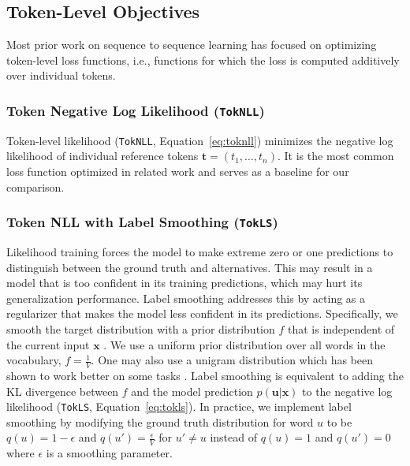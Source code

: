 \documentclass[11pt,a4paper]{article}
\newcommand{\source}{\mathbf{x}}
\newcommand{\goldreference}{\mathbf{t}}
\newcommand{\goldreferencetok}{t}
\newcommand{\candhypo}{\mathbf{u}}
\newcommand{\candhypotok}{u}
\newcommand{\TokNLL}{\texttt{TokNLL}}
\newcommand{\TokLS}{\texttt{TokLS}}
\begin{document}
\subsection{Token-Level Objectives}
\label{sec:tokobj}

Most prior work on sequence to sequence learning has focused on optimizing token-level loss functions, i.e., functions for which the loss is computed additively over individual tokens.

\subsubsection*{Token Negative Log Likelihood (\TokNLL)}
\label{sec:toknll}
Token-level likelihood (\TokNLL, Equation~\ref{eq:toknll}) minimizes the negative log likelihood of individual reference tokens $\goldreference = \left( \goldreferencetok_1, \dots, \goldreferencetok_n \right)$.
It is the most common loss function optimized in related work and serves as a baseline for our comparison.

\subsubsection*{Token NLL with Label Smoothing (\TokLS)}
\label{sec:tokls}
Likelihood training forces the model to make extreme zero or one predictions to distinguish between the ground truth and alternatives.
This may result in a model that is too confident in its training predictions, which may hurt its generalization performance.
Label smoothing addresses this by acting as a regularizer that makes the model less confident in its predictions.
Specifically, we smooth the target distribution with a prior distribution $f$ that is independent of the current input $\source$ \citep{szegedy2015inception,pereyra2017regularize,vaswani2017transformer}.
We use a uniform prior distribution over all words in the vocabulary, \( f = \frac{1}{V} \). One may also use a unigram distribution which has been shown to work better on some tasks \citep{pereyra2017regularize}.
Label smoothing is equivalent to adding the KL divergence between $f$ and the model prediction $p(\candhypo|\source)$ to the negative log likelihood (\TokLS, Equation~\ref{eq:tokls}).
In practice, we implement label smoothing by modifying the ground truth distribution for word $\candhypotok$ to be $q(\candhypotok) = 1 - \epsilon$ and $q(\candhypotok') = \frac{\epsilon}{V}$ for $\candhypotok' \ne \candhypotok$ instead of $q(\candhypotok) = 1$ and $q(\candhypotok') = 0$ where $\epsilon$ is a smoothing parameter.
\end{document}
